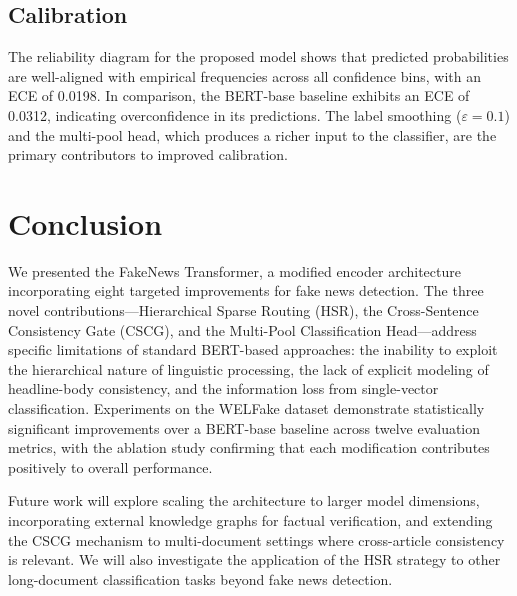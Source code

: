\documentclass[conference]{IEEEtran}
\begin{document}
\subsection{Calibration}

The reliability diagram for the proposed model shows that predicted probabilities are well-aligned with empirical frequencies across all confidence bins, with an ECE of 0.0198. In comparison, the BERT-base baseline exhibits an ECE of 0.0312, indicating overconfidence in its predictions. The label smoothing ($\varepsilon = 0.1$) and the multi-pool head, which produces a richer input to the classifier, are the primary contributors to improved calibration.

\section{Conclusion}
\label{sec:conclusion}

We presented the FakeNews Transformer, a modified encoder architecture incorporating eight targeted improvements for fake news detection. The three novel contributions---Hierarchical Sparse Routing (HSR), the Cross-Sentence Consistency Gate (CSCG), and the Multi-Pool Classification Head---address specific limitations of standard BERT-based approaches: the inability to exploit the hierarchical nature of linguistic processing, the lack of explicit modeling of headline-body consistency, and the information loss from single-vector classification. Experiments on the WELFake dataset demonstrate statistically significant improvements over a BERT-base baseline across twelve evaluation metrics, with the ablation study confirming that each modification contributes positively to overall performance.

Future work will explore scaling the architecture to larger model dimensions, incorporating external knowledge graphs for factual verification, and extending the CSCG mechanism to multi-document settings where cross-article consistency is relevant. We will also investigate the application of the HSR strategy to other long-document classification tasks beyond fake news detection.
\end{document}
